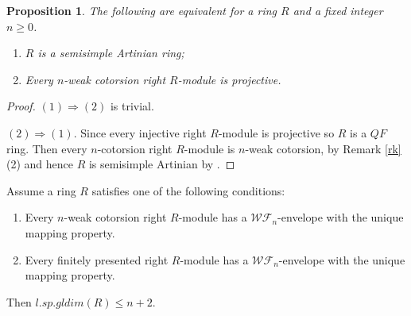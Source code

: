 ﻿\documentclass[
11pt,%
tightenlines,%
twoside,%
onecolumn,%
nofloats,%
nobibnotes,%
nofootinbib,%
superscriptaddress,%
noshowpacs,%
centertags]%
{revtex4}
\newtheorem{proposition}{Proposition}
\begin{document}
\begin{proposition}
The following are equivalent for a ring $R$ and a fixed integer $n \geq 0$.
\begin{enumerate}
\item $R$ is a semisimple Artinian ring;
\item Every $n$-weak cotorsion right $R$-module is projective.
\end{enumerate}
\end{proposition}

\begin{proof}
$(1) \Rightarrow (2)$ is trivial.

$(2) \Rightarrow (1)$. Since every injective right $R$-module is
projective so $R$ is  a $QF$ ring. Then every $n$-cotorsion right
$R$-module is $n$-weak cotorsion, by Remark \ref{rk}(2) and hence
$R$ is semisimple Artinian by \cite[Corollary $6.5$]{MD}.
\end{proof}

\begin{theorem}
Assume a ring $R$ satisfies one of the following conditions:
\begin{enumerate}
\item Every $n$-weak cotorsion right $R$-module has a $\mathcal{WF}_n$-envelope with the unique mapping property.
\item Every finitely presented right $R$-module has a $\mathcal{WF}_n$-envelope with the unique mapping property.
\end{enumerate}
Then $l.sp.gldim(R) \leq n+2$.
\end{theorem}
\end{document}
